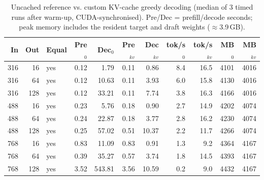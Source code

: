 \begin{table}[t]
\centering
\caption{Uncached reference vs. custom KV-cache greedy decoding (median of 3 timed runs after warm-up, CUDA-synchronised). Pre/Dec = prefill/decode seconds; peak memory includes the resident target and draft weights ($\approx$3.9\,GB).}
\label{tab:kv}
\footnotesize
\begin{tabular}{rrlrrrrrrrr}
\toprule
In & Out & Equal & Pre$_0$ & Dec$_0$ & Pre$_{kv}$ & Dec$_{kv}$ & tok/s$_0$ & tok/s$_{kv}$ & MB$_0$ & MB$_{kv}$ \\
\midrule
316 & 16 & yes & 0.12 & 1.79 & 0.11 & 0.86 & 8.4 & 16.5 & 4101 & 4016 \\
316 & 64 & yes & 0.12 & 10.63 & 0.11 & 3.93 & 6.0 & 15.8 & 4130 & 4016 \\
316 & 128 & yes & 0.12 & 33.21 & 0.11 & 7.74 & 3.8 & 16.3 & 4166 & 4016 \\
488 & 16 & yes & 0.23 & 5.76 & 0.18 & 0.90 & 2.7 & 14.9 & 4202 & 4074 \\
488 & 64 & yes & 0.24 & 22.87 & 0.18 & 3.77 & 2.8 & 16.2 & 4230 & 4074 \\
488 & 128 & yes & 0.25 & 57.02 & 0.51 & 10.37 & 2.2 & 11.7 & 4266 & 4074 \\
768 & 16 & yes & 0.83 & 11.09 & 0.83 & 0.91 & 1.3 & 9.2 & 4364 & 4167 \\
768 & 64 & yes & 0.39 & 35.27 & 0.57 & 3.74 & 1.8 & 14.5 & 4393 & 4167 \\
768 & 128 & yes & 3.52 & 543.81 & 3.56 & 10.59 & 0.2 & 9.0 & 4432 & 4167 \\
\bottomrule
\end{tabular}
\end{table}

